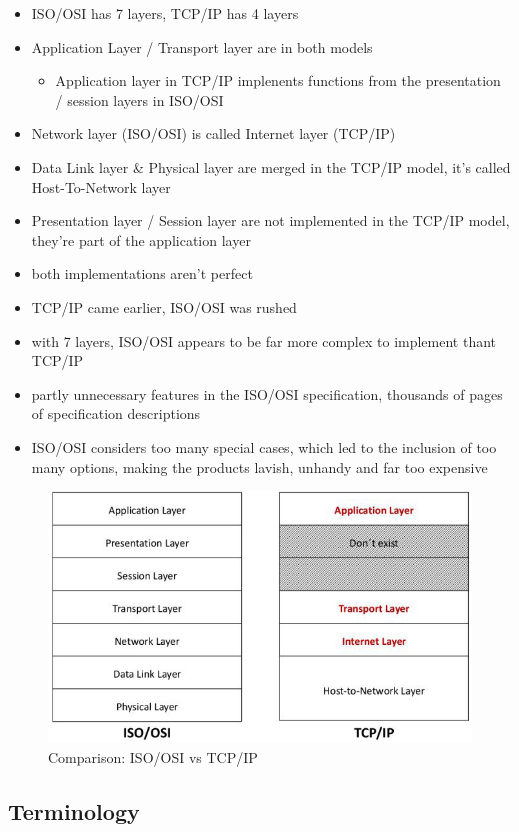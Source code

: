 \documentclass[a4paper,12pt]{article}
\begin{document}
 \begin{itemize}[itemsep=0pt]
 	\item  ISO/OSI has 7 layers, TCP/IP has 4 layers
 	\item  Application Layer / Transport layer are in both models
 	\begin{itemize}
 		\item  Application layer in TCP/IP implenents functions from the presentation / session layers in ISO/OSI
 	\end{itemize}
 	\item  Network layer (ISO/OSI) is called Internet layer (TCP/IP)
 	\item  Data Link layer \& Physical layer are merged in the TCP/IP model, it's called Host-To-Network layer
 	\item  Presentation layer / Session layer are not implemented in the TCP/IP model, they're part of the application layer
 	\item  both implementations aren't perfect
 	\item  TCP/IP came earlier, ISO/OSI was rushed
 	\item  with 7 layers, ISO/OSI appears to be far more complex to implement thant TCP/IP
 	\item  partly unnecessary features in the ISO/OSI specification, thousands of pages of specification descriptions
 	\item  ISO/OSI considers too many special cases, which led to the inclusion of too many options, making the products lavish, unhandy and far too expensive
 \end{itemize}
  \begin{figure}[h!]
 	\begin{center}
 		\includegraphics[width=0.7\linewidth]{TCP-OSI.png} 
 		\caption{Comparison: ISO/OSI vs TCP/IP}
 	\end{center}
 \end{figure}


 \subsection{Terminology}
\end{document}
